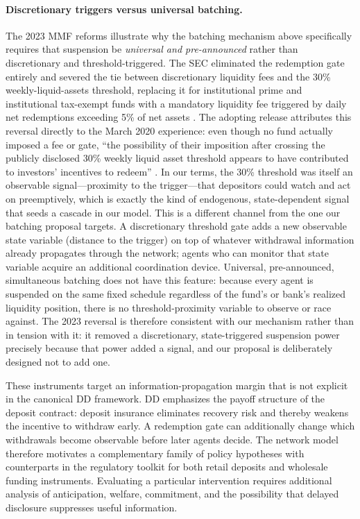 \documentclass[12pt]{article}\usepackage[]{graphicx}\usepackage[]{xcolor}
\begin{document}
\paragraph{Discretionary triggers versus universal batching.}
The 2023 MMF reforms illustrate why the batching mechanism above specifically requires that suspension be \textit{universal and pre-announced} rather than discretionary and threshold-triggered.
The SEC eliminated the redemption gate entirely and severed the tie between discretionary liquidity fees and the 30\% weekly-liquid-assets threshold, replacing it for institutional prime and institutional tax-exempt funds with a mandatory liquidity fee triggered by daily net redemptions exceeding 5\% of net assets \citep{sec_mmf_reform_2023}.
The adopting release attributes this reversal directly to the March 2020 experience: even though no fund actually imposed a fee or gate, ``the possibility of their imposition after crossing the publicly disclosed 30\% weekly liquid asset threshold appears to have contributed to investors' incentives to redeem'' \citep{sec_mmf_reform_2023}.
In our terms, the 30\% threshold was itself an observable signal---proximity to the trigger---that depositors could watch and act on preemptively, which is exactly the kind of endogenous, state-dependent signal that seeds a cascade in our model.
This is a different channel from the one our batching proposal targets.
A discretionary threshold gate adds a new observable state variable (distance to the trigger) on top of whatever withdrawal information already propagates through the network; agents who can monitor that state variable acquire an additional coordination device.
Universal, pre-announced, simultaneous batching does not have this feature: because every agent is suspended on the same fixed schedule regardless of the fund's or bank's realized liquidity position, there is no threshold-proximity variable to observe or race against.
The 2023 reversal is therefore consistent with our mechanism rather than in tension with it: it removed a discretionary, state-triggered suspension power precisely because that power added a signal, and our proposal is deliberately designed not to add one.

These instruments target an information-propagation margin that is not explicit in the canonical DD framework.
DD emphasizes the payoff structure of the deposit contract: deposit insurance eliminates recovery risk and thereby weakens the incentive to withdraw early.
A redemption gate can additionally change which withdrawals become observable before later agents decide.
The network model therefore motivates a complementary family of policy hypotheses with counterparts in the regulatory toolkit for both retail deposits and wholesale funding instruments.
Evaluating a particular intervention requires additional analysis of anticipation, welfare, commitment, and the possibility that delayed disclosure suppresses useful information.
\end{document}
